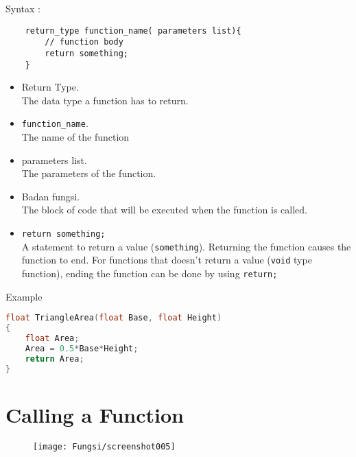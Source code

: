 Syntax :
\begin{verbatim}
    return_type function_name( parameters list){
        // function body
    	return something;
    }
\end{verbatim}
\begin{itemize}
	\item Return Type.\\ The data type a function has to return.
	\item \verb*|function_name|.\\ The name of the function
	\item parameters list.\\ %
    The parameters of the function. 
	\item Badan fungsi.\\ The block of code that will be executed when the function is called.%
	\item \verb|return something;|\\ A statement to return a value (\verb|something|). Returning the function causes the function to end.%
    For functions that doesn't return a value (\verb|void| type function), ending the function can be done by using \verb|return;|
\end{itemize}
Example

\begin{lstlisting}[language=c]
float TriangleArea(float Base, float Height)
{
	float Area;
	Area = 0.5*Base*Height;
	return Area;
}
\end{lstlisting}


\section{Calling a Function} 

\begin{figure}[H]
	\centering
	\texttt{[image: Fungsi/screenshot005]}
	\caption{}
	\label{fig:memanggilfungsi}
\end{figure}

